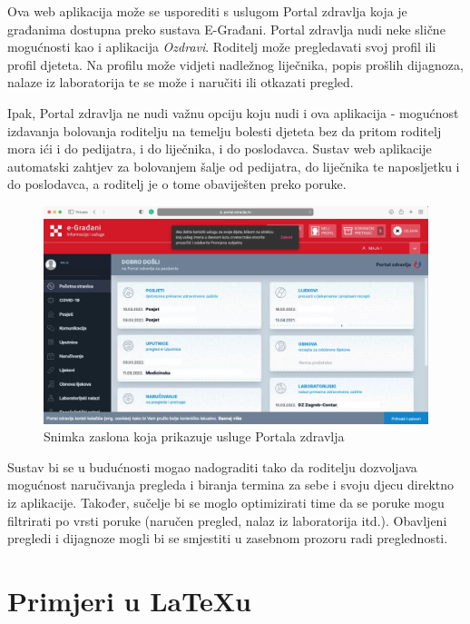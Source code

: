 		
		Ova web aplikacija može se usporediti s uslugom Portal zdravlja koja je građanima dostupna preko sustava E-Građani. Portal zdravlja nudi neke slične mogućnosti kao i aplikacija \textit{Ozdravi}. Roditelj može pregledavati svoj profil ili profil djeteta. Na profilu može vidjeti nadležnog liječnika, popis prošlih dijagnoza, nalaze iz laboratorija te se može i naručiti ili otkazati pregled.
		 
		Ipak, Portal zdravlja ne nudi važnu opciju koju nudi i ova aplikacija - mogućnost izdavanja bolovanja roditelju na temelju bolesti djeteta bez da pritom roditelj mora ići i do pedijatra, i do liječnika, i do poslodavca. Sustav web aplikacije automatski zahtjev za bolovanjem šalje od pedijatra, do liječnika te naposljetku i do poslodavca, a roditelj je o tome obaviješten preko poruke.\\
		
		\begin{figure}[H]
			\includegraphics[width=\textwidth]{slike/portalZdravlja.PNG} %
			\caption{Snimka zaslona koja prikazuje usluge Portala zdravlja}
		\end{figure}
		
		Sustav bi se u budućnosti mogao nadograditi tako da roditelju dozvoljava mogućnost naručivanja pregleda i biranja termina za sebe i svoju djecu direktno iz aplikacije. Također, sučelje bi se moglo optimizirati time da se poruke mogu filtrirati po vrsti poruke (naručen pregled, nalaz iz laboratorija itd.). Obavljeni pregledi i dijagnoze mogli bi se smjestiti u zasebnom prozoru radi preglednosti. 
		
		\section{Primjeri u \LaTeX u}
		
